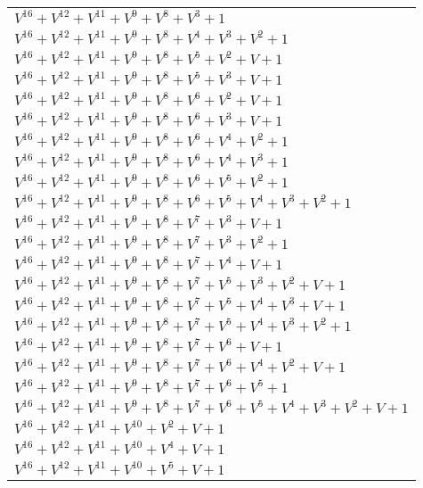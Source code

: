 \documentclass[12pt]{article}
\begin{document}
\begin{adjustwidth}{-4cm}{}
\begin{center}
\begin{longtable}{|l|}
$V^{16}  +V^{12}  +V^{11}  +V^{9}  +V^{8}  +V^{3}  + 1$ \\
$V^{16}  +V^{12}  +V^{11}  +V^{9}  +V^{8}  +V^{4}  +V^{3}  +V^{2}  + 1$ \\
$V^{16}  +V^{12}  +V^{11}  +V^{9}  +V^{8}  +V^{5}  +V^{2}  + V + 1$ \\
$V^{16}  +V^{12}  +V^{11}  +V^{9}  +V^{8}  +V^{5}  +V^{3}  + V + 1$ \\
$V^{16}  +V^{12}  +V^{11}  +V^{9}  +V^{8}  +V^{6}  +V^{2}  + V + 1$ \\
$V^{16}  +V^{12}  +V^{11}  +V^{9}  +V^{8}  +V^{6}  +V^{3}  + V + 1$ \\
$V^{16}  +V^{12}  +V^{11}  +V^{9}  +V^{8}  +V^{6}  +V^{4}  +V^{2}  + 1$ \\
$V^{16}  +V^{12}  +V^{11}  +V^{9}  +V^{8}  +V^{6}  +V^{4}  +V^{3}  + 1$ \\
$V^{16}  +V^{12}  +V^{11}  +V^{9}  +V^{8}  +V^{6}  +V^{5}  +V^{2}  + 1$ \\
$V^{16}  +V^{12}  +V^{11}  +V^{9}  +V^{8}  +V^{6}  +V^{5}  +V^{4}  +V^{3}  +V^{2}  + 1$ \\
$V^{16}  +V^{12}  +V^{11}  +V^{9}  +V^{8}  +V^{7}  +V^{3}  + V + 1$ \\
$V^{16}  +V^{12}  +V^{11}  +V^{9}  +V^{8}  +V^{7}  +V^{3}  +V^{2}  + 1$ \\
$V^{16}  +V^{12}  +V^{11}  +V^{9}  +V^{8}  +V^{7}  +V^{4}  + V + 1$ \\
$V^{16}  +V^{12}  +V^{11}  +V^{9}  +V^{8}  +V^{7}  +V^{5}  +V^{3}  +V^{2}  + V + 1$ \\
$V^{16}  +V^{12}  +V^{11}  +V^{9}  +V^{8}  +V^{7}  +V^{5}  +V^{4}  +V^{3}  + V + 1$ \\
$V^{16}  +V^{12}  +V^{11}  +V^{9}  +V^{8}  +V^{7}  +V^{5}  +V^{4}  +V^{3}  +V^{2}  + 1$ \\
$V^{16}  +V^{12}  +V^{11}  +V^{9}  +V^{8}  +V^{7}  +V^{6}  + V + 1$ \\
$V^{16}  +V^{12}  +V^{11}  +V^{9}  +V^{8}  +V^{7}  +V^{6}  +V^{4}  +V^{2}  + V + 1$ \\
$V^{16}  +V^{12}  +V^{11}  +V^{9}  +V^{8}  +V^{7}  +V^{6}  +V^{5}  + 1$ \\
$V^{16}  +V^{12}  +V^{11}  +V^{9}  +V^{8}  +V^{7}  +V^{6}  +V^{5}  +V^{4}  +V^{3}  +V^{2}  + V + 1$ \\
$V^{16}  +V^{12}  +V^{11}  +V^{10}  +V^{2}  + V + 1$ \\
$V^{16}  +V^{12}  +V^{11}  +V^{10}  +V^{4}  + V + 1$ \\
$V^{16}  +V^{12}  +V^{11}  +V^{10}  +V^{5}  + V + 1$ \\

\end{longtable}
\end{center}
\end{adjustwidth}
\end{document}
